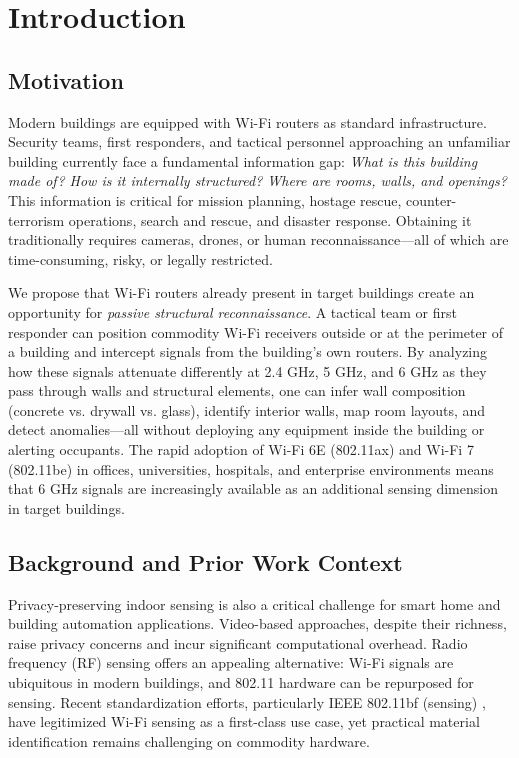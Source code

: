 \documentclass[conference]{IEEEtran}
\begin{document}
\section{Introduction}

\subsection{Motivation}

Modern buildings are equipped with Wi-Fi routers as standard infrastructure. Security teams, first responders, and tactical personnel approaching an unfamiliar building currently face a fundamental information gap: \textit{What is this building made of? How is it internally structured? Where are rooms, walls, and openings?} This information is critical for mission planning, hostage rescue, counter-terrorism operations, search and rescue, and disaster response. Obtaining it traditionally requires cameras, drones, or human reconnaissance—all of which are time-consuming, risky, or legally restricted.

We propose that Wi-Fi routers already present in target buildings create an opportunity for \textit{passive structural reconnaissance}. A tactical team or first responder can position commodity Wi-Fi receivers outside or at the perimeter of a building and intercept signals from the building's own routers. By analyzing how these signals attenuate differently at 2.4 GHz, 5 GHz, and 6 GHz as they pass through walls and structural elements, one can infer wall composition (concrete vs. drywall vs. glass), identify interior walls, map room layouts, and detect anomalies—all without deploying any equipment inside the building or alerting occupants. The rapid adoption of Wi-Fi 6E (802.11ax) and Wi-Fi 7 (802.11be) in offices, universities, hospitals, and enterprise environments means that 6 GHz signals are increasingly available as an additional sensing dimension in target buildings.

\subsection{Background and Prior Work Context}

Privacy-preserving indoor sensing is also a critical challenge for smart home and building automation applications. Video-based approaches, despite their richness, raise privacy concerns and incur significant computational overhead. Radio frequency (RF) sensing offers an appealing alternative: Wi-Fi signals are ubiquitous in modern buildings, and 802.11 hardware can be repurposed for sensing. Recent standardization efforts, particularly IEEE 802.11bf (sensing) \cite{802-11bf-standard-2025}, have legitimized Wi-Fi sensing as a first-class use case, yet practical material identification remains challenging on commodity hardware.
\end{document}
